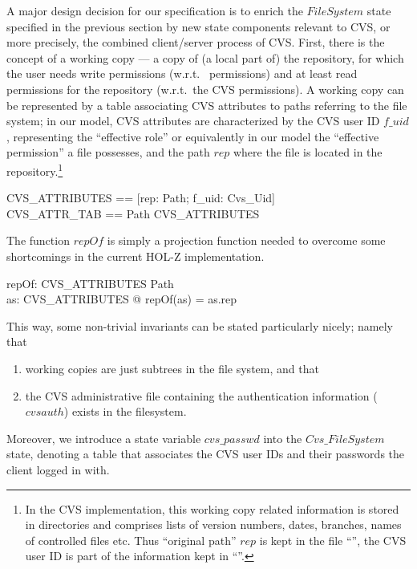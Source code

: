 A major design decision for our specification is to enrich the $FileSystem$
state specified in the previous section by new state components relevant to CVS,
or more precisely, the combined client/server process of CVS\@. First, there is
the concept of a working copy --- a copy of (a local part of) the repository,
for which the user needs write permissions (w.r.t.\ \unix{} permissions) and at
least read permissions for the repository (w.r.t.\ the CVS permissions).  A
working copy can be represented by a table associating CVS attributes to paths
referring to the file system; in our model, CVS attributes are characterized by
the CVS user ID $f\_uid$, representing the ``effective role'' or equivalently in our
model the ``effective permission'' a file possesses, and the path $rep$ where
the file is located in the repository.\footnote{In the CVS implementation, this
  working copy related information is stored in  directories and
  comprises lists of version numbers, dates, branches, names of controlled files
  etc. Thus ``original path'' $rep$ is kept in the file
  ``'', the CVS user ID is part of the information kept in
  ``''.}
\begin{zed}
  CVS\_ATTRIBUTES == [rep: Path; f\_uid: Cvs\_Uid] \\
  CVS\_ATTR\_TAB == Path \pfun CVS\_ATTRIBUTES \\
\end{zed}

\noindent The function $repOf$ is simply a projection function needed to
overcome some shortcomings in the current HOL-Z implementation.
\begin{axdef}
  repOf: CVS\_ATTRIBUTES \fun Path \\
  \where
  \forall as: CVS\_ATTRIBUTES @ repOf(as) = as.rep \\
\end{axdef}

\noindent This way, some non-trivial invariants can be stated particularly
nicely; namely that
\begin{enumerate}
\item working copies are just subtrees in the file system, and that
\item the CVS administrative file containing the authentication information
  ($cvsauth$) exists in the filesystem.
\end{enumerate}

Moreover, we introduce a state variable $cvs\_passwd$ into the $Cvs\_FileSystem$
state, denoting a table that associates the CVS user IDs and their passwords the
client logged in with.

